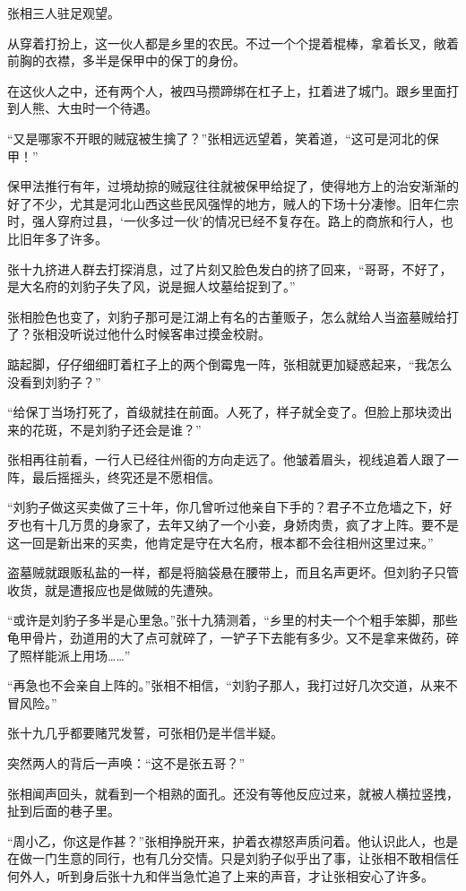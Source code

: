 张相三人驻足观望。

从穿着打扮上，这一伙人都是乡里的农民。不过一个个提着棍棒，拿着长叉，敞着前胸的衣襟，多半是保甲中的保丁的身份。

在这伙人之中，还有两个人，被四马攒蹄绑在杠子上，扛着进了城门。跟乡里面打到人熊、大虫时一个待遇。

“又是哪家不开眼的贼寇被生擒了？”张相远远望着，笑着道，“这可是河北的保甲！”

保甲法推行有年，过境劫掠的贼寇往往就被保甲给捉了，使得地方上的治安渐渐的好了不少，尤其是河北山西这些民风强悍的地方，贼人的下场十分凄惨。旧年仁宗时，强人穿府过县，‘一伙多过一伙’的情况已经不复存在。路上的商旅和行人，也比旧年多了许多。

张十九挤进人群去打探消息，过了片刻又脸色发白的挤了回来，“哥哥，不好了，是大名府的刘豹子失了风，说是掘人坟墓给捉到了。”

张相脸色也变了，刘豹子那可是江湖上有名的古董贩子，怎么就给人当盗墓贼给打了？张相没听说过他什么时候客串过摸金校尉。

踮起脚，仔仔细细盯着杠子上的两个倒霉鬼一阵，张相就更加疑惑起来，“我怎么没看到刘豹子？”

“给保丁当场打死了，首级就挂在前面。人死了，样子就全变了。但脸上那块烫出来的花斑，不是刘豹子还会是谁？”

张相再往前看，一行人已经往州衙的方向走远了。他皱着眉头，视线追着人跟了一阵，最后摇摇头，终究还是不愿相信。

“刘豹子做这买卖做了三十年，你几曾听过他亲自下手的？君子不立危墙之下，好歹也有十几万贯的身家了，去年又纳了一个小妾，身娇肉贵，疯了才上阵。要不是这一回是新出来的买卖，他肯定是守在大名府，根本都不会往相州这里过来。”

盗墓贼就跟贩私盐的一样，都是将脑袋悬在腰带上，而且名声更坏。但刘豹子只管收货，就是遭报应也是做贼的先遭殃。

“或许是刘豹子多半是心里急。”张十九猜测着，“乡里的村夫一个个粗手笨脚，那些龟甲骨片，劲道用的大了点可就碎了，一铲子下去能有多少。又不是拿来做药，碎了照样能派上用场……”

“再急也不会亲自上阵的。”张相不相信，“刘豹子那人，我打过好几次交道，从来不冒风险。”

张十九几乎都要赌咒发誓，可张相仍是半信半疑。

突然两人的背后一声唤：“这不是张五哥？”

张相闻声回头，就看到一个相熟的面孔。还没有等他反应过来，就被人横拉竖拽，扯到后面的巷子里。

“周小乙，你这是作甚？”张相挣脱开来，护着衣襟怒声质问着。他认识此人，也是在做一门生意的同行，也有几分交情。只是刘豹子似乎出了事，让张相不敢相信任何外人，听到身后张十九和伴当急忙追了上来的声音，才让张相安心了许多。

